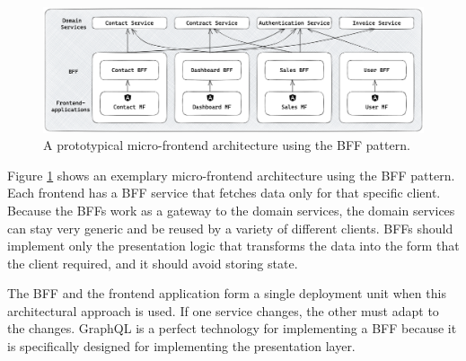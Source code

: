 \ifshowImages
\begin{figure}[H]
  \centering
  \includegraphics[width=0.95\linewidth]{images/background/micro-frontends/bff-architecture.png}
  \caption{A prototypical micro-frontend architecture using the \ac{BFF} pattern.}\label{fig:background:micro-frontend:bff-architecture}
\end{figure}
\fi

\noindent Figure \ref{fig:background:micro-frontend:bff-architecture} shows an exemplary micro-frontend architecture using the \ac{BFF} pattern. Each frontend has a \ac{BFF} service that fetches data only for that specific client. Because the \acp{BFF} work as a gateway to the domain services, the domain services can stay very generic and be reused by a variety of different clients. \acp{BFF} should implement only the presentation logic that transforms the data into the form that the client required, and it should avoid storing state. \cite{misc:2019:leitner:background:micro-frontends:backend-for-frontends}
\bigskip

\noindent The \ac{BFF} and the frontend application form a single deployment unit when this architectural approach is used. If one service changes, the other must adapt to the changes. GraphQL is a perfect technology for implementing a \ac{BFF} because it is specifically designed for implementing the presentation layer.
